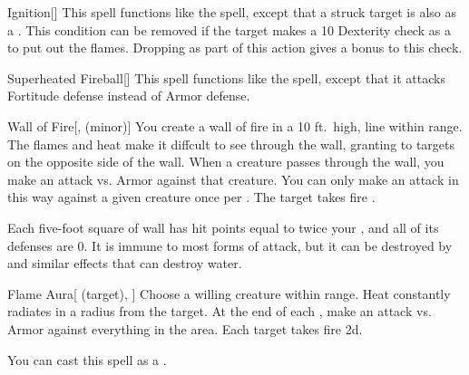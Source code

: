\lowercase{\hypertarget{spell:Ignition}{}}\label{spell:Ignition}
\begin{freeability}[\nth{3}]{\hypertarget{spell:Ignition}{Ignition}}[]
This spell functions like the  spell, except that a struck target is also  as a .
This condition can be removed if the target makes a  10 Dexterity check as a  to put out the flames.
Dropping  as part of this action gives a  bonus to this check.
\end{freeability}
\vspace{0.25em}



\lowercase{\hypertarget{spell:Superheated Fireball}{}}\label{spell:Superheated Fireball}
\begin{freeability}[\nth{3}]{\hypertarget{spell:Superheated Fireball}{Superheated Fireball}}[]
This spell functions like the  spell, except that it attacks Fortitude defense instead of Armor defense.
\end{freeability}
\vspace{0.25em}



\lowercase{\hypertarget{spell:Wall of Fire}{}}\label{spell:Wall of Fire}
\begin{freeability}[\nth{3}]{\hypertarget{spell:Wall of Fire}{Wall of Fire}}[,  (minor)]
You create a wall of fire in a 10 ft.\ high, \arealarge line within \rngmed range.
The flames and heat make it diffcult to see through the wall, granting  to targets on the opposite side of the wall.
When a creature passes through the wall, you make an attack vs. Armor against that creature.
You can only make an attack in this way against a given creature once per .
\hit The target takes fire .

Each five-foot square of wall has hit points equal to twice your , and all of its defenses are 0.
It is immune to most forms of attack, but it can be destroyed by  and similar effects that can destroy water.
\end{freeability}
\vspace{0.25em}



\lowercase{\hypertarget{spell:Flame Aura}{}}\label{spell:Flame Aura}
\begin{attuneability}[\nth{4}]{\hypertarget{spell:Flame Aura}{Flame Aura}}[ (target), ]
Choose a willing creature within \rngclose range.
Heat constantly radiates in a \areasmall radius  from the target.
At the end of each , make an attack vs. Armor against everything in the area.
\hit Each target takes fire  \minus2d.

You can cast this spell as a .
\end{attuneability}
\vspace{0.25em}



